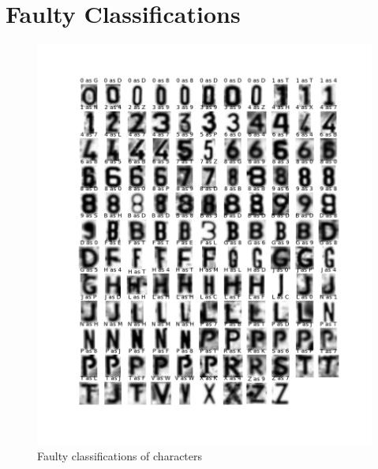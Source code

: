 \documentclass[a4paper]{article}
\begin{document}
\appendix
\section{Faulty Classifications}
\begin{figure}[H]
\center
\includegraphics[scale=0.5]{faulty.png}
\caption{Faulty classifications of characters}
\end{figure}
\end{document}
